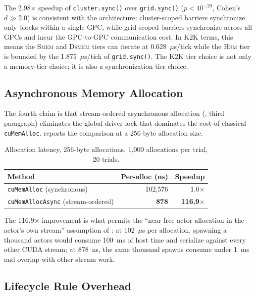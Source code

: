 The 2.98$\times$ speedup of \texttt{cluster.sync()} over
\texttt{grid.sync()} (\(p < 10^{-20}\), Cohen's \(d \gg 2.0\))
is consistent with the architecture: cluster-scoped barriers
synchronize only blocks within a single GPC, while grid-scoped
barriers synchronize across all GPCs and incur the GPC-to-GPC
communication cost.  In K2K terms, this means the
\textsc{Smem} and \textsc{Dsmem} tiers can iterate at
0.628~$\mu$s/tick while the \textsc{Hbm} tier is bounded by the
1.875~$\mu$s/tick of \texttt{grid.sync()}.  The K2K tier choice is
not only a memory-tier choice; it is also a synchronization-tier
choice.

\subsection{Asynchronous Memory Allocation}
\label{sec:eval:async-mem}

The fourth claim is that stream-ordered asynchronous allocation
(, third paragraph) eliminates the global driver
lock that dominates the cost of classical \texttt{cuMemAlloc}.
 reports the comparison at a 256-byte
allocation size.

\begin{table}[htbp]
\centering
\begin{tabular}{lrr}
\toprule
Method & Per-alloc (ns) & Speedup \\
\midrule
\texttt{cuMemAlloc} (synchronous) & 102{,}576 & 1.0$\times$ \\
\texttt{cuMemAllocAsync} (stream-ordered) & \textbf{878} & \textbf{116.9$\times$} \\
\bottomrule
\end{tabular}
\caption{Allocation latency, 256-byte allocations, 1{,}000
allocations per trial, 20 trials.}
\label{tab:async-alloc}
\end{table}

The 116.9$\times$ improvement is what permits the
``near-free actor allocation in the actor's own stream'' assumption
of : at 102~$\mu$s per allocation,
spawning a thousand actors would consume 100~ms of host time and
serialize against every other CUDA stream; at 878~ns, the same
thousand spawns consume under 1~ms and overlap with other stream
work.

\subsection{Lifecycle Rule Overhead}
\label{sec:eval:lifecycle}

